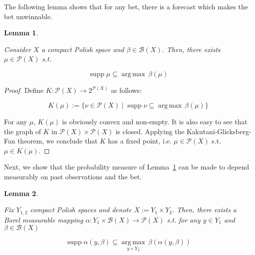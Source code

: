 \documentclass[11pt]{article}
\theoremstyle{definition}
\theoremstyle{plain}
\newtheorem{lemma}{Lemma}%
\newcommand{\Argmax}[1]{\underset{#1}{\operatorname{arg\,max}}\,}
\newcommand{\PM}{\mathcal{P}}
\DeclareMathOperator{\Sp}{supp}
\newcommand{\Gm}{\mathcal{B}}
\begin{document}
The following lemma shows that for any bet, there is a forecast which makes the bet unwinnable.

\begin{lemma}
\label{lmm:unwinnable}

Consider $X$ a compact Polish space and $\beta \in \Gm\left(X\right)$. Then, there exists $\mu \in \PM\left(X\right)$ s.t.

\begin{equation}
\Sp \mu \subseteq \Argmax{} \beta\left(\mu\right)
\end{equation}

\end{lemma}

\begin{proof}

Define ${K: \PM\left(X\right) \rightarrow 2^{\PM\left(X\right)}}$ as follows:

\[K\left(\mu\right):=\{\nu \in \PM\left(X\right) \mid \Sp{\nu} \subseteq \Argmax{}{\beta\left(\mu\right)}\}\]

For any ${\mu}$, ${K}\left(\mu\right)$ is obviously convex and non-empty. It is also easy to see that the graph of $K$ in $\PM\left(X\right) \times \PM\left(X\right)$ is closed. Applying the Kakutani-Glicksberg-Fan theorem, we conclude that $K$ has a fixed point, i.e. $\mu \in \PM\left(X\right)$ s.t. $\mu \in K\left(\mu\right)$.
\end{proof}

Next, we show that the probability measure of Lemma~\ref{lmm:unwinnable} can be made to depend measurably on past observations and the bet.

\begin{lemma}
\label{lmm:measurable_unwinnable}

Fix $Y_{1,2}$ compact Polish spaces and denote $X:=Y_1 \times Y_2$. Then, there exists a Borel measurable mapping $\alpha: Y_1 \times \Gm\left(X\right) \rightarrow \PM\left(X\right)$ s.t. for any $y \in Y_1$ and $\beta \in \Gm\left(X\right)$

\begin{equation}
\Sp \alpha\left(y,\beta\right) \subseteq \Argmax{y \times Y_2} \beta\left(\alpha\left(y,\beta\right)\right)
\end{equation}

\end{lemma}
\end{document}
